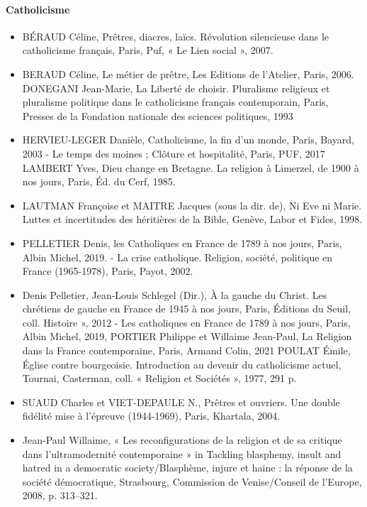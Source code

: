 \paragraph{Catholicisme}
\begin{itemize}  
\item BÉRAUD Céline, Prêtres, diacres, laïcs. Révolution silencieuse dans le catholicisme  français, Paris, Puf, « Le Lien social », 2007. 
\item BERAUD Céline, Le métier de prêtre, Les Editions de l’Atelier, Paris, 2006. DONEGANI Jean-Marie, La Liberté de choisir. Pluralisme religieux et pluralisme politique  dans le catholicisme français contemporain, Paris, Presses de la Fondation nationale des sciences politiques, 1993  
\item HERVIEU-LEGER Danièle, Catholicisme, la fin d’un monde, Paris, Bayard, 2003 - Le temps des moines ; Clôture et hospitalité, Paris, PUF, 2017 LAMBERT Yves, Dieu change en Bretagne. La religion à Limerzel, de 1900 à nos jours,  Paris, Éd. du Cerf, 1985. 

\item LAUTMAN Françoise et MAITRE Jacques (sous la dir. de), Ni Eve ni Marie. Luttes et  incertitudes des héritières de la Bible,  Genève, Labor et Fides, 1998. 
\item PELLETIER Denis, les Catholiques en France de 1789 à nos jours, Paris, Albin Michel, 2019. - La crise catholique. Religion, société, politique en France (1965-1978), Paris, Payot, 2002. 
\item  Denis Pelletier, Jean-Louis Schlegel (Dir.), À la gauche du Christ. Les chrétiens de gauche en France de 1945 à nos jours, Paris, Éditions du Seuil, coll.  Histoire », 2012 - Les catholiques en France de 1789 à nos jours, Paris, Albin Michel, 2019,  PORTIER Philippe et Willaime Jean-Paul, La Religion dans la France contemporaine,   Paris, Armand Colin, 2021 POULAT Émile, Église contre bourgeoisie. Introduction au devenir du catholicisme actuel,  Tournai, Casterman, coll. « Religion et Sociétés », 1977, 291 p. 
\item SUAUD Charles et VIET-DEPAULE N., Prêtres et ouvriers. Une double fidélité mise à  l’épreuve (1944-1969), Paris, Khartala, 2004. 
\item Jean-Paul Willaime, « Les reconfigurations de la religion et de sa critique dans l’ultramodernité contemporaine » in Tackling blasphemy, insult and hatred in a democratic society/Blasphème, injure et haine : la réponse de la société démocratique, Strasbourg, Commission de Venise/Conseil de l’Europe, 2008, p. 313–321. 

\end{itemize}
